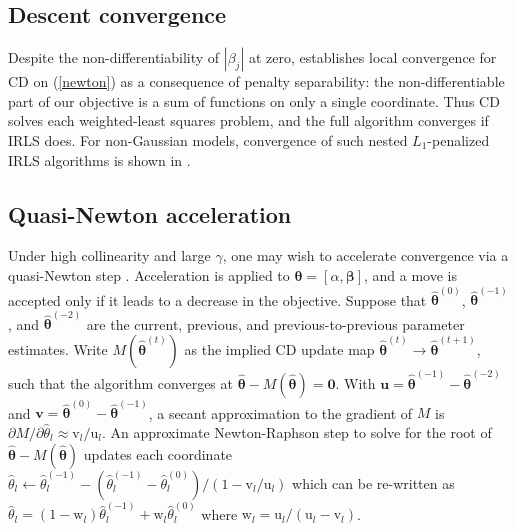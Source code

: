 \documentclass[12pt]{article}
\newcommand{\bs}[1]{\boldsymbol{#1}}
\newcommand{\mr}[1]{\mathrm{#1}}
\newcommand{\bm}[1]{\mathbf{#1}}
\begin{document}
\subsection{Descent convergence}

 Despite the non-differentiability of $|\beta_j|$ at zero,
\citet{tseng_convergence_2001} establishes local convergence for CD on
(\ref{newton}) as a consequence of penalty separability: the
non-differentiable part of our objective is a sum of functions on only a
single coordinate.  Thus CD solves each weighted-least squares problem, and
the full algorithm converges if IRLS does.  For non-Gaussian models,
convergence of such nested $L_1$-penalized IRLS algorithms is shown
in \cite{lee_proximal_2014}.

\subsection{Quasi-Newton acceleration}
\label{qn}

Under high collinearity and large $\gamma$, one may wish to accelerate convergence via a quasi-Newton step
\citep[e.g.,][]{lange_numerical_2010}. Acceleration is applied to $\bs{\theta}
= [\alpha,\bs{\beta}]$, and a move is accepted only if it leads to a decrease
in the objective. Suppose that $\bs{\hat\theta}^{(0)}$,
$\bs{\hat\theta}^{(-1)}$, and $\bs{\hat\theta}^{(-2)}$ are the current,
previous, and previous-to-previous parameter estimates.  Write
$M(\bs{\hat\theta}^{(t)})$ as the implied CD update map $\bs{\hat\theta}^{(t)}
\rightarrow \bs{\hat\theta}^{(t+1)}$, such that the algorithm converges at
$\bs{\hat\theta} - M(\bs{\hat\theta}) = \bm{0}$.  With $\bm{u} =
\bs{\hat\theta}^{(-1)} - \bs{\hat\theta}^{(-2)}$ and $\bm{v} =
\bs{\hat\theta}^{(0)} - \bs{\hat\theta}^{(-1)}$, a secant approximation to the
gradient of $M$ is $\partial M/\partial \hat\theta_l \approx
\mr{v}_l/\mr{u}_l$.  An approximate Newton-Raphson step to solve for the root
of $\bs{\hat\theta} - M(\bs{\hat\theta}) $  updates each coordinate $\hat
\theta_l \gets \hat\theta_l^{(-1)} - (\hat\theta_l^{(-1)} -
\hat\theta_l^{(0)})/(1-\mr{v}_l/\mr{u}_l)$ which can be re-written as
$\hat\theta_l = (1-\mr{w}_l)\hat\theta_l^{(-1)} + \mr{w}_l\hat\theta_l^{(0)} $
where $\mr{w}_l = \mr{u}_l/(\mr{u}_l - \mr{v}_l)$.
\end{document}
